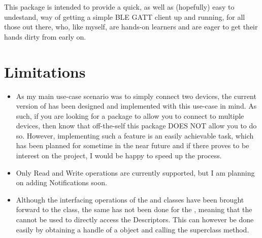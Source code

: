 \documentclass[letterpaper,10pt,english]{sphinxmanual}
\begin{document}
This package is intended to provide a quick, as well as (hopefully) easy to undestand, way of getting a simple BLE GATT client up and running, for all those out there, who, like myself, are hands-on learners and are eager to get their hands dirty from early on.


\section{Limitations}
\label{\detokenize{intro:limitations}}\begin{itemize}
\item {} 
As my main use-case scenario was to simply connect two devices, the current version of {\hyperref[\detokenize{simpleble:simpleble.SimpleBleClient}]{}} has been designed and implemented with this use-case in mind. As such, if you are looking for a package to allow you to connect to multiple devices, then know that off-the-self this package DOES NOT allow you to do so. However, implementing such a feature is an easily achievable task, which has been planned for sometime in the near future and if there proves to be interest on the project, I would be happy to speed up the process.

\item {} 
Only Read and Write operations are currently supported, but I am planning on adding Notifications soon.

\item {} 
Although the interfacing operations of the  and  classes have been brought forward to the {\hyperref[\detokenize{simpleble:simpleble.SimpleBleClient}]{}} class, the same has not been done for the , meaning that the {\hyperref[\detokenize{simpleble:simpleble.SimpleBleClient}]{}} cannot be used to directly access the Descriptors. This can however be done easily by obtaining a handle of a {\hyperref[\detokenize{simpleble:simpleble.SimpleBleDevice}]{}} object and calling the superclass  method.

\end{itemize}
\end{document}
